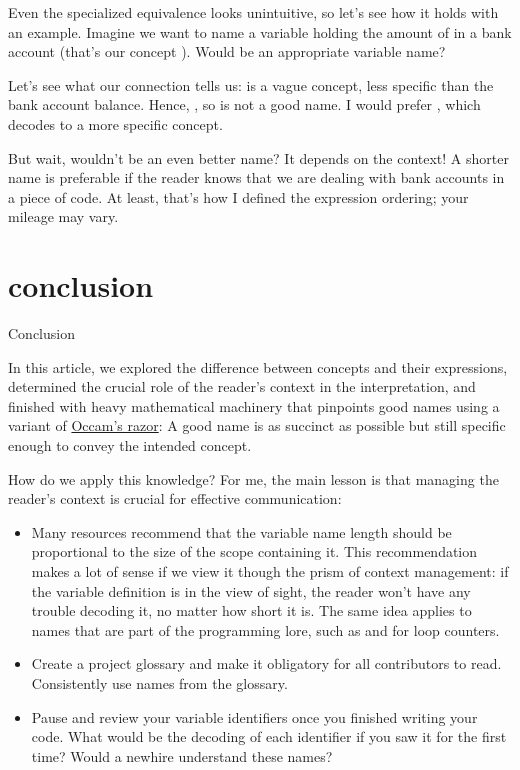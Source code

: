 \documentclass{article}
\begin{document}
Even the specialized equivalence looks unintuitive, so let's see how it holds with an example.
Imagine we want to name a variable holding the amount of  in a bank account (that's our concept ).
Would  be an appropriate variable name?

Let's see what our connection tells us:  is a vague concept, less specific than the bank account balance.
Hence, , so  is not a good name.
I would prefer , which decodes to a more specific concept.

But wait, wouldn't  be an even better name?
It depends on the context!
A shorter name is preferable if the reader knows that we are dealing with bank accounts in a piece of code.
At least, that's how I defined the expression ordering; your mileage may vary.

\section{conclusion}{Conclusion}

In this article, we explored the difference between concepts and their expressions,
determined the crucial role of the reader's context in the interpretation,
and finished with heavy mathematical machinery that pinpoints good names using a variant of \href{https://en.wikipedia.org/wiki/Occam's_razor}{Occam's razor}:
A good name is as succinct as possible but still specific enough to convey the intended concept.

How do we apply this knowledge?
For me, the main lesson is that managing the reader's context is crucial for effective communication:

\begin{itemize}
\item
  Many resources recommend that the variable name length should be proportional to the size of the scope containing it.
  This recommendation makes a lot of sense if we view it though the prism of context management: if the variable definition is in the view of sight, the reader won't have any trouble decoding it, no matter how short it is.
  The same idea applies to names that are part of the programming lore, such as  and  for loop counters.
\item
  Create a project glossary and make it obligatory for all contributors to read.
  Consistently use names from the glossary.
\item
  Pause and review your variable identifiers once you finished writing your code.
  What would be the decoding of each identifier if you saw it for the first time?
  Would a newhire understand these names?
\end{itemize}
\end{document}
